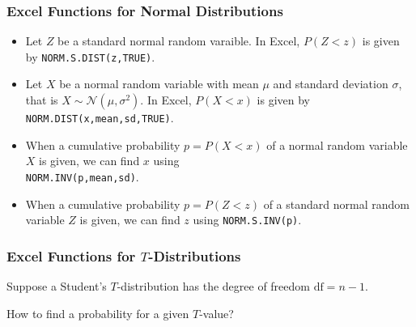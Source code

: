 \hypertarget{excel-functions-for-normal-distributions}{%
\subsubsection{Excel Functions for Normal
Distributions}\label{excel-functions-for-normal-distributions}}

\begin{itemize}
\item
  Let \(Z\) be a standard normal random varaible. In Excel, \(P(Z<z)\)
  is given by \texttt{NORM.S.DIST(z,TRUE)}.
\item
  Let \(X\) be a normal random variable with mean \(\mu\) and standard
  deviation \(\sigma\), that is \(X\sim \mathcal{N}(\mu, \sigma^2)\). In
  Excel, \(P(X<x)\) is given by \texttt{NORM.DIST(x,mean,sd,TRUE)}.
\item
  When a cumulative probability \(p=P(X<x)\) of a normal random variable
  \(X\) is given, we can find \(x\) using\\ \texttt{NORM.INV(p,mean,sd)}.
\item
  When a cumulative probability \(p=P(Z<z)\) of a standard normal random
  variable \(Z\) is given, we can find \(z\) using
  \texttt{NORM.S.INV(p)}.
\end{itemize}

\hypertarget{excel-functions-for-t-distributions}{%
\subsubsection{\texorpdfstring{Excel Functions for
\(T\)-Distributions}{Excel Functions for T-Distributions}}\label{excel-functions-for-t-distributions}}

Suppose a Student's \(T\)-distribution has the degree of freedom
\(\text{df}=n-1\).

How to find a probability for a given \(T\)-value?

